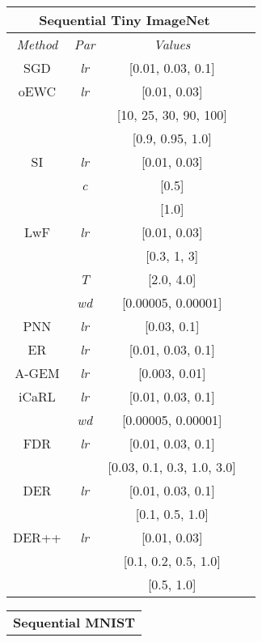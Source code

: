 \documentclass{article}
\begin{document}
{\begin{table}[H]
\begin{multicols}{3}
\begin{tabular}{cccc}
\toprule
\multicolumn{3}{c}{\textbf{Sequential Tiny ImageNet}}\\
\midrule
\textit{Method} & \textit{Par} &
\textit{Values} \\
\midrule
SGD  & \textit{lr} & [0.01, 0.03, 0.1] \\
\midrule
oEWC & \textit{lr} & [0.01, 0.03] \\
& \textit{} & [10, 25, 30, 90, 100] \\
& \textit{} & [0.9, 0.95, 1.0] \\
\midrule
SI   & \textit{lr} & [0.01, 0.03] \\
& \textit{c} & [0.5] \\
& \textit{} & [1.0] \\
\midrule
LwF  & \textit{lr} & [0.01, 0.03] \\
& \textit{} & [0.3, 1, 3] \\
& \textit{T} & [2.0, 4.0] \\
& \textit{wd} & [0.00005, 0.00001] \\
\midrule
PNN  & \textit{lr} & [0.03, 0.1] \\
\midrule
ER  & \textit{lr} & [0.01, 0.03, 0.1] \\
\midrule
A-GEM  & \textit{lr} & [0.003, 0.01] \\
\midrule
iCaRL & \textit{lr} & [0.01, 0.03, 0.1] \\
& \textit{wd} & [0.00005, 0.00001] \\
\midrule
FDR  & \textit{lr} & [0.01, 0.03, 0.1] \\
& \textit{} & [0.03, 0.1, 0.3, 1.0, 3.0] \\
\midrule
DER  & \textit{lr} & [0.01, 0.03, 0.1] \\
& \textit{} & [0.1, 0.5, 1.0] \\
\midrule
DER++ & \textit{lr} & [0.01, 0.03] \\
& \textit{} & [0.1, 0.2, 0.5, 1.0] \\
& \textit{} & [0.5, 1.0] \\
\bottomrule
\end{tabular}     \end{multicols}
\end{table}
\newpage
\begin{table}[H]
    \begin{multicols}{3}
        \setlength{\tabcolsep}{3.5pt}
        \scriptsize
        \begin{tabular}{ccc}
\toprule
\multicolumn{3}{c}{\textbf{Sequential MNIST}}\\

\end{tabular}
\end{multicols}
\end{table}}
\end{document}
